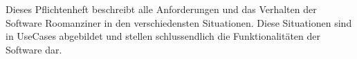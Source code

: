 \documentclass[../../Pflichtenheft.tex]{subfiles}
\begin{document}
	Dieses Pflichtenheft beschreibt alle Anforderungen und das
	Verhalten der Software Roomanziner in den verschiedensten
	Situationen. Diese Situationen sind in UseCases abgebildet
	und stellen schlussendlich die Funktionalitäten der Software
	dar.	
\end{document}
